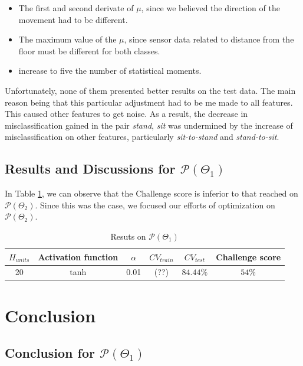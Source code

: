 \begin{itemize}
	\item The first and second derivate of $\mu$, since we believed the direction of the movement had to be different.
	\item The maximum value of the $\mu$, since sensor data related to distance from the floor must be different for both classes.
	\item increase to five the number of statistical moments.
\end{itemize}

Unfortunately, none of them presented better results on the test data. The main reason being that this particular adjustment had to be me made to all features. This caused other features to get noise. As a result, the decrease in misclassification gained in the pair  \emph{stand}, \emph{sit} was undermined by the increase of misclassification on other features, particularly \emph{sit-to-stand} and \emph{stand-to-sit}.

\subsection{Results and Discussions for  $\mathcal{P}(\Theta_{1})$}

In Table \ref{table:p1_result}, we can observe that the Challenge score is inferior to that reached on $\mathcal{P}(\Theta_{2})$. Since this was the case, we focused our efforts of optimization on $\mathcal{P}(\Theta_{2})$.

\begin{table}[h!]
	\begin{center}
		\begin{tabular}{||c c c c c c||}
			\hline
			$H_{units}$ &Activation function & $\alpha$ & $CV_{train}$ & $CV_{test}$  & Challenge score \\ [0.5ex]
			\hline
			20 & tanh &0.01& (??) & $84.44\%$& $54\%$  \\
			\hline
		\end{tabular}
		\caption{Resuts on $\mathcal{P}(\Theta_{1})$}
		\label{table:p1_result}
	\end{center}
\end{table}

\section{Conclusion}

\subsection{Conclusion for $\mathcal{P}(\Theta_{1})$}

